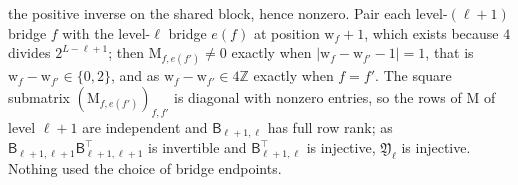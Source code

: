 the positive inverse on the shared block, hence nonzero. Pair each
level-\((\ell+1)\) bridge \(f\) with the level-\(\ell\) bridge \(e(f)\) at
position \(\mathrm w_f+1\), which exists because \(4\) divides
\(2^{L-\ell+1}\); then \(\mathrm M_{f,e(f')}\ne0\) exactly when
\(|\mathrm w_f-\mathrm w_{f'}-1|=1\), that is
\(\mathrm w_f-\mathrm w_{f'}\in\{0,2\}\), and as
\(\mathrm w_f-\mathrm w_{f'}\in4\mathbb Z\) exactly when \(f=f'\). The
square submatrix \((\mathrm M_{f,e(f')})_{f,f'}\) is diagonal with nonzero
entries, so the rows of \(\mathrm M\) of level \(\ell+1\) are independent and
\(\mathsf B_{\ell+1,\ell}\) has full row rank; as
\(\mathsf B_{\ell+1,\ell+1}\mathsf B_{\ell+1,\ell+1}^\top\) is invertible and
\(\mathsf B_{\ell+1,\ell}^\top\) is injective, \(\mathfrak Y_\ell\) is
injective. Nothing used the choice of bridge endpoints.

